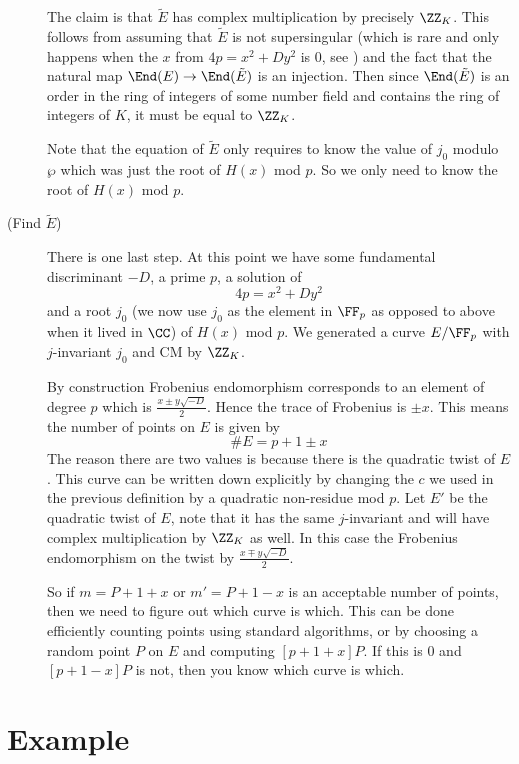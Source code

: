 \documentclass[11pt]{article}
\begin{document}
\begin{description}
	The claim is that $\tilde{E}$ has complex multiplication by precisely $\ZZ_K$. This follows from assuming that $\tilde{E}$ is not supersingular (which is rare and only happens when the $x$ from $4p = x^2 + Dy^2$ is $0$, see \cite[Ex.~5.10b]{silverman2009arithmetic}) and the fact that the natural map $\End(E) \to \End(\tilde{E})$ is an injection. Then since $\End(\tilde{E})$ is an order in the ring of integers of some number field and contains the ring of integers of $K$, it must be equal to $\ZZ_K$.
	
	Note that the equation of $\tilde{E}$ only requires to know the value of $j_0$ modulo $\wp$ which was just the root of $H(x)$ mod $p$. So we only need to know the root of $H(x)$ mod $p$.
	
	\item[(Find $\tilde{E}$)]
	
	There is one last step. At this point we have some fundamental discriminant $-D$, a prime $p$, a solution of
	$$
	4p = x^2 + Dy^2
	$$
	and a root $j_0$ (we now use $j_0$ as the element in $\FF_p$ as opposed to above when it lived in $\CC$) of $H(x)$ mod $p$. We generated a curve $E/\FF_p$ with $j$-invariant $j_0$ and CM by $\ZZ_K$.
	
	By construction Frobenius endomorphism corresponds to an element of degree $p$ which is $\frac{x \pm y\sqrt{-D}}{2}$. Hence the trace of Frobenius is $\pm x$. This means the number of points on $E$ is given by
	$$
	\#E = p + 1 \pm x
	$$
	The reason there are two values is because there is the quadratic twist of $E$. This curve can be written down explicitly by changing the $c$ we used in the previous definition by a quadratic non-residue mod $p$. Let $E'$ be the quadratic twist of $E$, note that it has the same $j$-invariant and will have complex multiplication by $\ZZ_K$ as well. In this case the Frobenius endomorphism on the twist by $\frac{x \mp y\sqrt{-D}}{2}$.
	
	So if $m = P + 1 + x$ or $m' = P + 1 - x$ is an acceptable number of points, then we need to figure out which curve is which. This can be done efficiently counting points using standard algorithms, or by choosing a random point $P$ on $E$ and computing $[p+1+x]P$. If this is $0$ and $[p+1-x]P$ is not, then you know which curve is which.
\end{description}


\section{Example}
\end{document}
